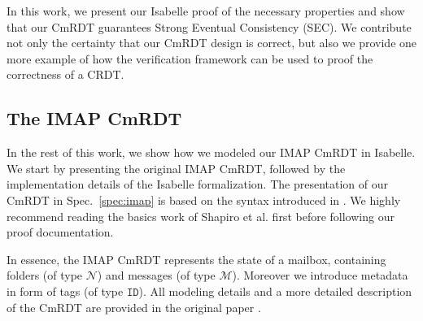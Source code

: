 \documentclass[11pt,a4paper, DIV=11]{article}
\begin{document}
In this work, we present our Isabelle proof of the necessary properties and
show that our CmRDT guarantees Strong Eventual Consistency (SEC).
We contribute not only the certainty that our CmRDT design is correct,
but also we provide one more example of how the verification framework
can be used to proof the correctness of a CRDT.

\subsection{The IMAP CmRDT}

In the rest of this work, we show how we modeled our IMAP CmRDT in Isabelle.
We start by presenting the original IMAP CmRDT, followed by the implementation
details of the Isabelle formalization.
The presentation of our CmRDT in Spec.~\ref{spec:imap} is based on the syntax
introduced in \cite{shapiro_report}. We highly recommend reading the basics work
of Shapiro et al{.} first before following our proof documentation.

In essence, the IMAP CmRDT represents the state of a mailbox, containing folders
(of type $\mathcal{N}$) and messages (of type $\mathcal{M}$). Moreover we
introduce metadata in form of tags (of type $\texttt{ID}$).
All modeling details and a more detailed description of the CmRDT are provided
in the original paper \cite{pluto}.
\end{document}
